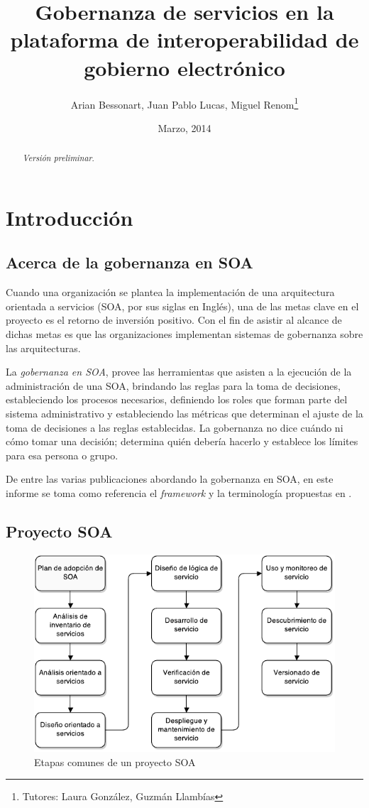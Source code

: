 \documentclass[11pt]{article}
\title{Gobernanza de servicios en la plataforma de interoperabilidad de gobierno electrónico}
\author{Arian Bessonart, Juan Pablo Lucas, Miguel Renom\thanks{Tutores: Laura González, Guzmán Llambías}}
\date{Marzo, 2014}
\begin{document}
	\maketitle
	\pagebreak

	\begin{abstract}
		\emph{Versión preliminar}.
	\end{abstract}
	\pagebreak

	\section{Introducción}
		\subsection{Acerca de la gobernanza en SOA}
			Cuando una organización se plantea la implementación de una arquitectura orientada a servicios (SOA, por sus siglas en Inglés), una de las metas clave en el proyecto es el retorno de inversión positivo. Con el fin de asistir al alcance de dichas metas es que las organizaciones implementan sistemas de gobernanza sobre las arquitecturas.

			La \emph{gobernanza en SOA}, provee las herramientas que asisten a la ejecución de la administración de una SOA, brindando las reglas para la toma de decisiones, estableciendo los procesos necesarios, definiendo los roles que forman parte del sistema administrativo y estableciendo las métricas que determinan el ajuste de la toma de decisiones a las reglas establecidas. La gobernanza no dice cuándo ni cómo tomar una decisión; determina quién debería hacerlo y establece los límites para esa persona o grupo. \cite{Erl:2011:SGG:1983453}

			De entre las varias publicaciones abordando la gobernanza en SOA, en este informe se toma como referencia el \emph{framework} y la terminología propuestas en \cite{Erl:2011:SGG:1983453}.

		\subsection{Proyecto SOA}
			\begin{figure}[h]
			    \centering
			    \includegraphics[width=\linewidth]{ciclo_de_vida_del_proyecto}
			    \caption{Etapas comunes de un proyecto SOA}
			    \label{figura:ciclo_de_vida_del_proyecto}
			\end{figure}
\end{document}
